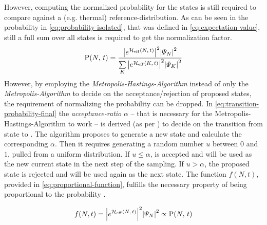 However, computing the normalized probability for the states is still required to compare against a (e.g. thermal) reference-distribution.
As can be seen in the probability in \autoref{eq:probability-isolated}, that was defined in \autoref{eq:expectation-value}, still a full sum over all states is required to get the normalization factor.
\begin{equation}
    \label{eq:probability-isolated}
    \probabilityOf{N}{t} = \frac{
        \absSquare{e^{\HeffOft}} \absSquare{\psiN} 
    }{
        \lsum[K] \absSquare{e^{\HeffOft[K]}} \absSquare{\psiN[K]} 
    }
\end{equation}
However, by employing the \emph{Metropolis-Hastings-Algorithm} instead of only the \emph{Metropolis-Algorithm} to decide on the acceptance/rejection of proposed states, the requirement of normalizing the probability can be dropped.
In \autoref{eq:transition-probability-final} the \emph{acceptance-ratio} $\alpha$ -- that is necessary for the Metropolis-Hastings-Algorithm to work -- is derived (as per \cite{metropolisHastingsAlgorithmGeneral}) to decide on the transition from state \ketN[N] to .
The algorithm proposes to generate a new state  and calculate the corresponding $\alpha$. Then it requires generating a random number $u$ between $0$ and $1$, pulled from a uniform distribution.
If $u \leq \alpha$,  is accepted and will be used as the new current state in the next step of the sampling. 
If $u>\alpha$, the proposed state is rejected and \ketN[N] will be used again as the next state.
The function $f(N,t)$, provided in \autoref{eq:proportional-function}, fulfills the necessary property of being proportional to the probability  .

\begin{equation}
    \label{eq:proportional-function}
    f(N,t) = \absSquare{e^{\HeffOft}} \absSquare{\psiN} \propto \probabilityOf{N}{t}
\end{equation}

